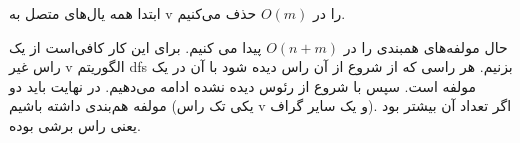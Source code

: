 ابتدا همه یال‌های متصل به v را در 
$O(m)$
حذف می‌کنیم.

حال مولفه‌های همبندی را در 
$O(n+m)$
پیدا می کنیم.
برای این کار کافی‌است از یک راس غیر v الگوریتم dfs بزنیم. هر راسی که از شروع از آن راس دیده شود با آن در یک مولفه است. سپس با شروع از رئوس دیده نشده ادامه می‌دهیم. در نهایت باید دو مولفه هم‌بندی داشته باشیم (یکی تک راس v و یک سایر گراف).
اگر تعداد آن بیشتر بود یعنی راس  برشی بوده.
